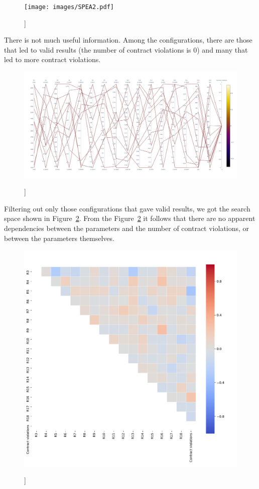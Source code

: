 \begin{figure}
	\centering
	\texttt{[image: images/SPEA2.pdf]}
	\caption[]]{}
	\label{fig:SearchSpaceViewFull}
\end{figure}

There is not much useful information. Among the configurations, there are those that led to valid results (the number of contract violations is 0) and many that led to more contract violations.

\begin{figure}
	\centering
	\includegraphics[width=\textwidth]{images/SPEA2_Zero_validity.html.pdf}
	\caption[]]{}
	\label{fig:SearchSpaceValid}
\end{figure}

Filtering out only those configurations that gave valid results, we got the search space shown in Figure~\ref{fig:SearchSpaceValid}. From the Figure~\ref{fig:SearchSpaceValid} it follows that there are no apparent dependencies between the parameters and the number of contract violations, or between the parameters themselves.

\begin{figure}
	\centering
	\includegraphics[width=\textwidth]{images/CorrelationAnalysis.pdf}
	\caption[]]{}
	\label{fig:CorrelationAnalysis}
\end{figure}

